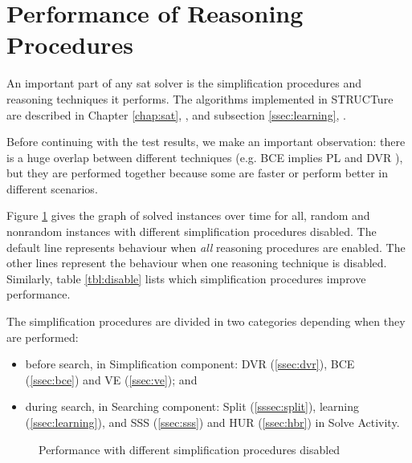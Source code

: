 \section{Performance of Reasoning Procedures}
\label{sec:perf-reasoning}

An important part of any sat solver is the simplification
procedures and reasoning techniques it performs. The algorithms
implemented in STRUCTure are described in Chapter \ref{chap:sat},
, and subsection \ref{ssec:learning},
.

Before continuing with the test results, we make an important
observation: there is a huge overlap between different techniques
(e.g. BCE implies PL and DVR \cite{Jarvisalo_blockedclause}),
but they are performed together because some are faster or perform
better in different scenarios.

Figure \ref{fig:disable} gives the graph of solved instances
over time for all, random and nonrandom instances with different
simplification procedures disabled.  The default line represents
behaviour when \emph{all} reasoning procedures are enabled. The
other lines represent the behaviour when one reasoning technique
is disabled. Similarly, table \ref{tbl:disable} lists which
simplification procedures improve performance.

The simplification procedures are divided in two categories
depending when they are performed:
\begin{itemize}
  \item before search, in Simplification component:
  DVR (\ref{ssec:dvr}), BCE (\ref{ssec:bce}) and VE (\ref{ssec:ve}); and
  \item during search, in Searching component:
  Split (\ref{sssec:split}), learning (\ref{ssec:learning}),
  and SSS (\ref{ssec:sss}) and HUR (\ref{ssec:hbr}) in Solve Activity.
\end{itemize}

\begin{figure}
  \centering
  \caption{Performance with different simplification procedures disabled}
  \label{fig:disable}
\end{figure}

